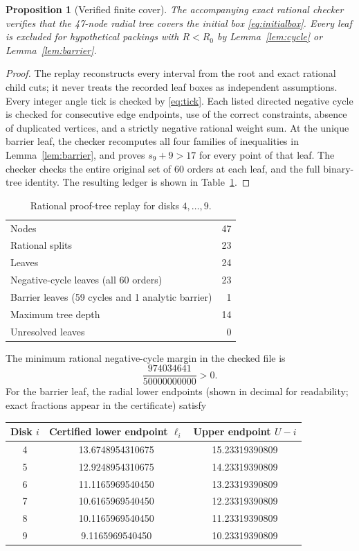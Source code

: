 \documentclass[11pt,a4paper]{article}
\newtheorem{proposition}[theorem]{Proposition}
\newcommand{\Rzero}{R_0}
\begin{document}
\begin{proposition}[Verified finite cover]\label{prop:certificate}
The accompanying exact rational checker verifies that the 47-node radial tree covers the initial box \eqref{eq:initialbox}. Every leaf is excluded for hypothetical packings with $R<\Rzero$ by Lemma~\ref{lem:cycle} or Lemma~\ref{lem:barrier}.
\end{proposition}
\begin{proof}
The replay reconstructs every interval from the root and exact rational child cuts; it never treats the recorded leaf boxes as independent assumptions. Every integer angle tick is checked by \eqref{eq:tick}. Each listed directed negative cycle is checked for consecutive edge endpoints, use of the correct constraints, absence of duplicated vertices, and a strictly negative rational weight sum. At the unique barrier leaf, the checker recomputes all four families of inequalities in Lemma~\ref{lem:barrier}, and proves $s_9+9>17$ for every point of that leaf. The checker checks the entire original set of 60 orders at each leaf, and the full binary-tree identity. The resulting ledger is shown in Table~\ref{tab:tree}.
\end{proof}
\begin{table}[htbp]\centering
\caption{Rational proof-tree replay for disks $4,\ldots,9$.}\label{tab:tree}
\begin{tabular}{lr}\toprule
Nodes & 47\\
Rational splits & 23\\
Leaves & 24\\
Negative-cycle leaves (all 60 orders) & 23\\
Barrier leaves (59 cycles and 1 analytic barrier) & 1\\
Maximum tree depth & 14\\
Unresolved leaves & 0\\
\bottomrule\end{tabular}
\end{table}
The minimum rational negative-cycle margin in the checked file is
\[
\frac{974034641}{50000000000}>0.
\]
For the barrier leaf, the radial lower endpoints (shown in decimal for readability; exact fractions appear in the certificate) satisfy
\begin{center}\small
\begin{tabular}{ccc}\toprule
Disk $i$ & Certified lower endpoint $\ell_i$ & Upper endpoint $U-i$\\\midrule
4 & 13.6748954310675 & 15.23319390809\\
5 & 12.9248954310675 & 14.23319390809\\
6 & 11.1165969540450 & 13.23319390809\\
7 & 10.6165969540450 & 12.23319390809\\
8 & 10.1165969540450 & 11.23319390809\\
9 & 9.1165969540450 & 10.23319390809\\
\bottomrule
\end{tabular}
\end{center}
\end{document}
